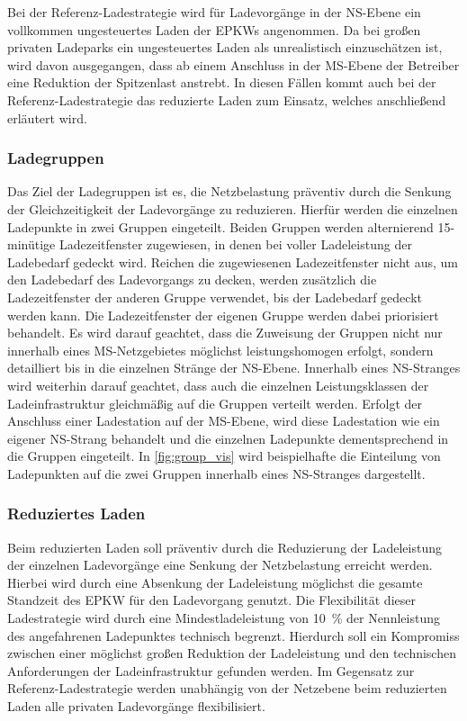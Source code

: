 Bei der Referenz-Ladestrategie wird für Ladevorgänge in der \gls{NS}-Ebene ein vollkommen ungesteuertes Laden der \glspl{EPKW} angenommen.
Da bei großen privaten Ladeparks ein ungesteuertes Laden als unrealistisch einzuschätzen ist, wird davon ausgegangen, dass ab einem Anschluss in der \gls{MS}-Ebene der Betreiber eine Reduktion der Spitzenlast anstrebt.
In diesen Fällen kommt auch bei der Referenz-Ladestrategie das reduzierte Laden zum Einsatz, welches anschließend erläutert wird.


\subsubsection{Ladegruppen}

Das Ziel der Ladegruppen ist es, die Netzbelastung präventiv durch die Senkung der Gleichzeitigkeit der Ladevorgänge zu reduzieren.
Hierfür werden die einzelnen Ladepunkte in zwei Gruppen eingeteilt.
Beiden Gruppen werden alternierend 15-minütige Ladezeitfenster zugewiesen, in denen bei voller Ladeleistung der Ladebedarf gedeckt wird.
Reichen die zugewiesenen Ladezeitfenster nicht aus, um den Ladebedarf des Ladevorgangs zu decken, werden zusätzlich die Ladezeitfenster der anderen Gruppe verwendet, bis der Ladebedarf gedeckt werden kann.
Die Ladezeitfenster der eigenen Gruppe werden dabei priorisiert behandelt.
Es wird darauf geachtet, dass die Zuweisung der Gruppen nicht nur innerhalb eines \gls{MS}-Netzgebietes möglichst leistungshomogen erfolgt, sondern detailliert bis in die einzelnen Stränge der \gls{NS}-Ebene.
Innerhalb eines \gls{NS}-Stranges wird weiterhin darauf geachtet, dass auch die einzelnen Leistungsklassen der Ladeinfrastruktur gleichmäßig auf die Gruppen verteilt werden.
Erfolgt der Anschluss einer Ladestation auf der \gls{MS}-Ebene, wird diese Ladestation wie ein eigener \gls{NS}-Strang behandelt und die einzelnen Ladepunkte dementsprechend in die Gruppen eingeteilt.
In \autoref{fig:group_vis} wird beispielhafte die Einteilung von Ladepunkten auf die zwei Gruppen innerhalb eines \gls{NS}-Stranges dargestellt. \cite{Schachler2021}




\subsubsection{Reduziertes Laden}

Beim reduzierten Laden soll präventiv durch die Reduzierung der Ladeleistung der einzelnen Ladevorgänge eine Senkung der Netzbelastung erreicht werden.
Hierbei wird durch eine Absenkung der Ladeleistung möglichst die gesamte Standzeit des \gls{EPKW} für den Ladevorgang genutzt.
Die Flexibilität dieser Ladestrategie wird durch eine Mindestladeleistung von \SI{10}{\percent} der Nennleistung des angefahrenen Ladepunktes technisch begrenzt.
Hierdurch soll ein Kompromiss zwischen einer möglichst großen Reduktion der Ladeleistung und den technischen Anforderungen der Ladeinfrastruktur gefunden werden.
Im Gegensatz zur Referenz-Ladestrategie werden unabhängig von der Netzebene beim reduzierten Laden alle privaten Ladevorgänge flexibilisiert. \cite{Schachler2021}


